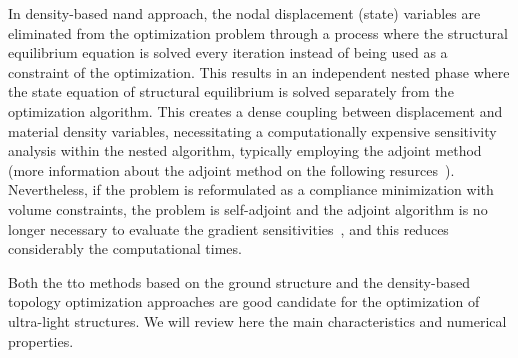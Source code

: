 In density-based \acrfull{nand} approach, the nodal displacement (state) variables are eliminated from the optimization problem through a process where the structural equilibrium equation is solved every iteration instead of being used as a constraint of the optimization. This results in an independent nested phase where the state equation of structural equilibrium is solved separately from the optimization algorithm. This creates a dense coupling between displacement and material density variables, necessitating a computationally expensive sensitivity analysis within the nested algorithm, typically employing the adjoint method (more information about the adjoint method on the following resurces~). Nevertheless, if the problem is reformulated as a compliance minimization with volume constraints, the problem is self-adjoint and the adjoint algorithm is no longer necessary to evaluate the gradient sensitivities~, and this reduces considerably the computational times.

Both the \gls{tto} methods based on the ground structure and the density-based topology optimization approaches are good candidate for the optimization of ultra-light structures. We will review here the main characteristics and numerical properties.



